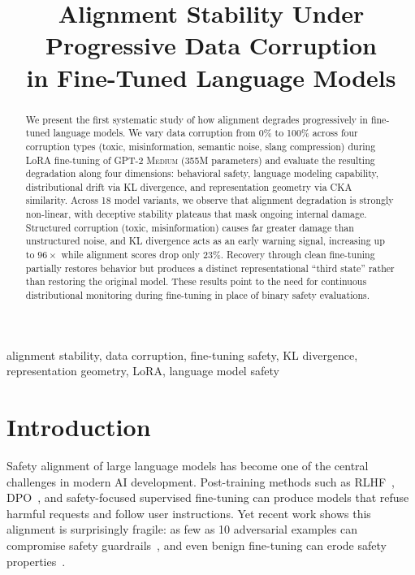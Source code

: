 \documentclass[conference]{IEEEtran}
\title{Alignment Stability Under Progressive Data Corruption\\in Fine-Tuned Language Models}
\author{
    \IEEEauthorblockN{Akshay Sasi}
    \IEEEauthorblockA{
        Independent Researcher\\
        India\\
        akshaysasi12.knr@gmail.com\\
        ORCID: XXXX-XXXX-XXXX-XXXX
    }
}
\newcommand{\model}{\textsc{GPT-2 Medium}}
\begin{document}
\maketitle

\begin{abstract}
We present the first systematic study of how alignment degrades progressively in fine-tuned language models. We vary data corruption from 0\% to 100\% across four corruption types (toxic, misinformation, semantic noise, slang compression) during LoRA fine-tuning of \model{} (355M parameters) and evaluate the resulting degradation along four dimensions: behavioral safety, language modeling capability, distributional drift via KL divergence, and representation geometry via CKA similarity. Across 18 model variants, we observe that alignment degradation is strongly non-linear, with deceptive stability plateaus that mask ongoing internal damage. Structured corruption (toxic, misinformation) causes far greater damage than unstructured noise, and KL divergence acts as an early warning signal, increasing up to $96\times$ while alignment scores drop only 23\%. Recovery through clean fine-tuning partially restores behavior but produces a distinct representational ``third state'' rather than restoring the original model. These results point to the need for continuous distributional monitoring during fine-tuning in place of binary safety evaluations.
\end{abstract}

\begin{IEEEkeywords}
alignment stability, data corruption, fine-tuning safety, KL divergence, representation geometry, LoRA, language model safety
\end{IEEEkeywords}

\section{Introduction}
\label{sec:introduction}

Safety alignment of large language models has become one of the central challenges in modern AI development. Post-training methods such as RLHF~\cite{ouyang2022training}, DPO~\cite{rafailov2023direct}, and safety-focused supervised fine-tuning can produce models that refuse harmful requests and follow user instructions. Yet recent work shows this alignment is surprisingly fragile: as few as 10 adversarial examples can compromise safety guardrails~\cite{qi2023fine}, and even benign fine-tuning can erode safety properties~\cite{yang2023shadow}.
\end{document}
